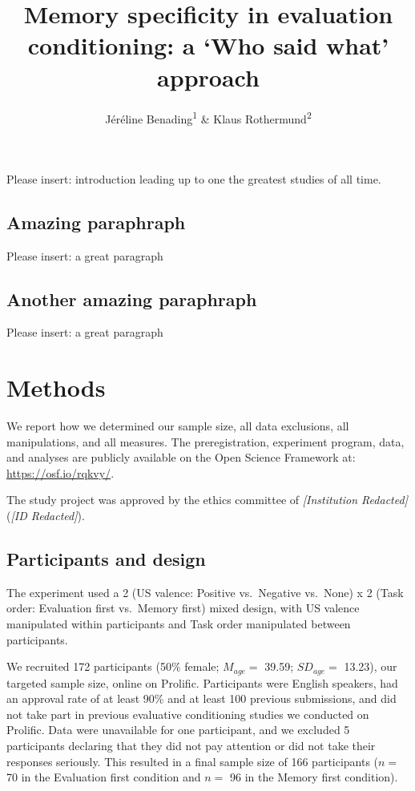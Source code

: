 \documentclass[
  man,floatsintext]{apa6}
\title{Memory specificity in evaluation conditioning: a `Who said what' approach}
\author{Jéréline Benading\textsuperscript{1} \& Klaus Rothermund\textsuperscript{2}}
\date{}
\affiliation{\vspace{0.5cm}\textsuperscript{1} Université Agnostique de Louvain-la-Jena\\\textsuperscript{2} Friedrich Schiller University Jena}
\begin{document}
\maketitle

Please insert: introduction leading up to one the greatest studies of all time.

\hypertarget{amazing-paraphraph}{%
\subsection{Amazing paraphraph}\label{amazing-paraphraph}}

Please insert: a great paragraph

\hypertarget{another-amazing-paraphraph}{%
\subsection{Another amazing paraphraph}\label{another-amazing-paraphraph}}

Please insert: a great paragraph

\hypertarget{methods}{%
\section{Methods}\label{methods}}

We report how we determined our sample size, all data exclusions, all manipulations, and all measures. The preregistration, experiment program, data, and analyses are publicly available on the Open Science Framework at: \url{https://osf.io/rqkvy/}.

The study project was approved by the ethics committee of \emph{{[}Institution Redacted{]}} (\emph{{[}ID Redacted{]}}).

\hypertarget{participants-and-design}{%
\subsection{Participants and design}\label{participants-and-design}}

The experiment used a 2 (US valence: Positive vs.~Negative vs.~None) x 2 (Task order: Evaluation first vs.~Memory first) mixed design, with US valence manipulated within participants and Task order manipulated between participants.

We recruited 172 participants (50\(\%\) female; \(M_{age} =\) 39.59; \(SD_{age} =\) 13.23), our targeted sample size, online on Prolific. Participants were English speakers, had an approval rate of at least 90\% and at least 100 previous submissions, and did not take part in previous evaluative conditioning studies we conducted on Prolific. Data were unavailable for one participant, and we excluded 5 participants declaring that they did not pay attention or did not take their responses seriously. This resulted in a final sample size of 166 participants (\(n =\) 70 in the Evaluation first condition and \(n =\) 96 in the Memory first condition).
\end{document}
